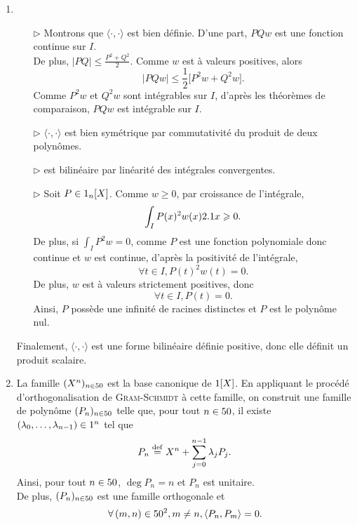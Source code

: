 \begin{solution}
    \begin{enumerate}
        \item 
        \begin{itemize}
            \item[$\rhd$] Montrons que $\langle \cdot, \cdot \rangle$ est bien définie. D'une part, $PQw$ est une fonction continue sur $I$. \\
            De plus, $|PQ| \leqslant \frac{P^2 + Q^2}{2}$. Comme $w$ est à valeurs positives, alors
            $$|PQw| \leqslant \frac{1}{2} \Big[ P^2 w + Q^2 w\Big].$$
            Comme $P^2 w$ et $Q^2 w$ sont intégrables sur $I$, d'après les théorèmes de comparaison, $PQw$ est intégrable sur $I$.
            \item[$\rhd$] $\langle \cdot, \cdot \rangle$ est bien symétrique par commutativité du produit de deux polynômes. 
            \item[$\rhd$] est bilinéaire par linéarité des intégrales convergentes.
            \item[$\rhd$] Soit $P \in 1_n[X]$. Comme $w \geqslant 0$, par croissance de l'intégrale, 
            $$\int_I P(x)^2 w(x) 2.1 x \geqslant 0.$$
            De plus, si $\displaystyle \int_I P^2 w = 0$, comme $P$ est une fonction polynomiale donc continue et $w$ est continue, d'après la positivité de l'intégrale,
            $$\forall t \in I, P(t)^2 w(t) = 0.$$
            De plus, $w$ est à valeurs strictement positives, donc
            $$\forall t \in I, P(t) = 0.$$
            Ainsi, $P$ possède une infinité de racines distinctes et $P$ est le polynôme nul.
        \end{itemize}
        Finalement, $\langle \cdot, \cdot \rangle$ est une forme bilinéaire définie positive, donc elle définit un produit scalaire. 
        \item La famille $(X^n)_{n \in 50}$ est la base canonique de $1[X]$. En appliquant le procédé d'orthogonalisation de \textsc{Gram}-\textsc{Schmidt} à cette famille, on construit une famille de polynôme $(P_n)_{n \in 50}$ telle que, pour tout $n \in 50$, il existe $(\lambda_0, \dots, \lambda_{n-1}) \in 1^n$ tel que
        $$P_n \overset{\mathrm{\tiny def}}{=} X^n + \sum_{j=0}^{n-1} \lambda_j P_j.$$
        Ainsi, pour tout $n \in 50$, $\deg P_n = n$ et $P_n$ est unitaire. \\
        De plus, $(P_n)_{n \in 50}$ est une famille orthogonale et 
        $$\forall (m, n) \in \N^2, m \not= n, \langle P_n, P_m \rangle = 0.$$

\end{enumerate}
\end{solution}
